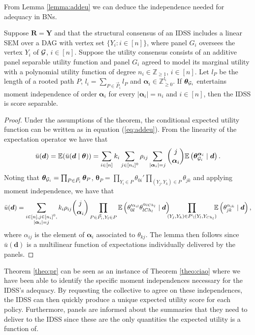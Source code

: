 From Lemma \ref{lemma:addeu} we can deduce the independence needed for adequacy in BNs. 
\begin{theorem}
\label{theo:pr}
Suppose $\bm{R}=\bm{Y} $ and that the structural consensus of an IDSS includes a linear SEM over a DAG with vertex set $\{Y_i:i\in[n]\}$, where panel $G_i$ oversees the vertex $Y_i$ of $\mathcal{G}$, $i\in[n]$. Suppose the utility consensus consists of an additive panel separable utility function and panel $G_i$ agreed to model its marginal utility with a polynomial utility function of degree $n_i\in\mathbb{Z}_{\geq 1}$, $i\in[n]$. Let $l_P$ be the length of a rooted path $P$, $l_i=\sum_{P\in\vec{P}_i}l_P$ and $\bm{\alpha}_i\in\mathbb{Z}^{l_i}_{\geq 0}$. If $\bm{\theta}_{\mathcal{G}_i}$ entertains moment independence of order $\bm{\alpha}_i$ for every $|\bm{\alpha}_i|=n_i$ and $i\in[n]$, then the IDSS is score separable.  
\end{theorem}
\begin{proof}
Under the assumptions of the theorem, the conditional expected utility function can be written as in equation (\ref{eq:addeu}). From the linearity of the expectation operator we have that
\[
\bar{u}(\bm{d})=\mathbb{E}(\bar{u}(\bm{d}\;|\;\bm{\theta}))= \sum_{i\in[n]}k_i\sum_{j\in[n_i]^0}\rho_{ij}\sum_{|\bm{\alpha}_i|=j}\binom{j}{\bm{\alpha}_i}\mathbb{E}\left(\bm{\theta}_{\mathcal{G}_i}^{\bm{\alpha}_i}\;|\;\bm{d}\right).
\]
Noting that $\bm{\theta}_{\mathcal{G}_i}=\prod_{P\in\vec{P}_i}\bm{\theta}_P$, $\bm{\theta}_P=\prod_{Y_i\in P}\theta_{0i}'\prod_{(Y_j,Y_k)\in P}\theta_{jk}$ and applying moment independence, we have that  
\[
\bar{u}(\bm{d})= \sum_{\substack{i\in[n], j\in[n_i]^0,\\ |\bm{\alpha}_i|=j}}k_i\rho_{ij}\binom{j}{\bm{\alpha}_i}\prod_{P\in\vec{P}_i,Y_l\in P}\E\left(\theta_{0l}'^{\alpha_{il}}\theta_{lCh_l}^{\alpha_{lCh_l}}\;|\;\bm{d}\right)\hspace{-0.2cm}\prod_{(Y_j,Y_k)\in P\setminus (Y_l,Y_{Ch_l})}\hspace{-0.2cm}\E\left(\theta_{jk}^{\alpha_{ik}}\;|\;\bm{d}\right),
\]
where $\alpha_{ij}$ is the element of $\bm{\alpha}_i$ associated to $\theta_{kj}$. The lemma  then follows since $\bar{u}(\bm{d})$ is a multilinear function of expectations individually delivered by the panels.
\end{proof}

Theorem \ref{theo:pr} can be seen as an instance of Theorem \ref{theo:ciao} where we have been able to identify the specific moment independences necessary for the IDSS's adequacy. By requesting the collective to agree on these independences, the IDSS can then quickly produce a unique expected utility score for each policy. Furthermore, panels are informed about the summaries that they need to deliver to the IDSS since these are the only quantities the expected utility is a function of. 

